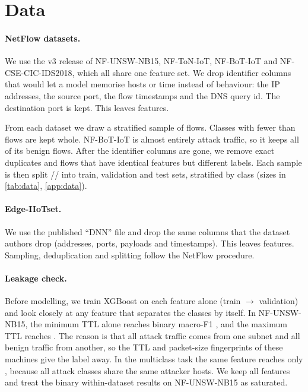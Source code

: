 \section{Data}\label{sec:data}
\paragraph{NetFlow datasets.} We use the v3 release of NF-UNSW-NB15, NF-ToN-IoT, NF-BoT-IoT and NF-CSE-CIC-IDS2018,
which all share one feature set. We drop  identifier columns that would let a model
memorise hosts or time instead of behaviour: the IP addresses, the source port, the flow timestamps and the DNS query
id. The destination port is kept. This leaves  features.

From each dataset we draw a stratified sample of  flows. Classes with fewer than
 flows are kept whole. NF-BoT-IoT is almost entirely attack traffic, so it
keeps all of its benign flows. After the identifier columns are gone, we remove exact duplicates and flows that have
identical features but different labels. Each sample is then split
// into train,
validation and test sets, stratified by class (sizes in \cref{tab:data}, \cref{app:data}).

\paragraph{Edge-IIoTset.} We use the published ``DNN'' file and drop the same
 columns that the dataset authors drop (addresses, ports, payloads and
timestamps). This leaves  features. Sampling, deduplication and splitting
follow the NetFlow procedure.


\paragraph{Leakage check.} Before modelling, we train XGBoost on each feature alone (train $\to$ validation) and
look closely at any feature that separates the classes by itself. In NF-UNSW-NB15, the minimum TTL alone reaches
binary macro-F1 , and the maximum TTL reaches
. The reason is that all attack traffic comes from one subnet and all benign
traffic from another, so the TTL and packet-size fingerprints of these machines give the label away. In the
multiclass task the same feature reaches only , because all attack
classes share the same attacker hosts. We keep all features and treat the binary within-dataset results on
NF-UNSW-NB15 as saturated.
